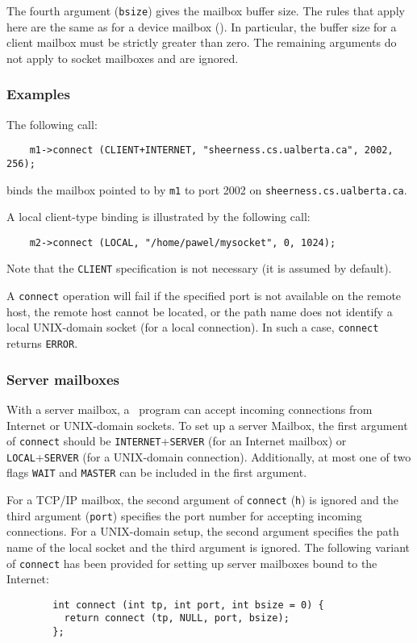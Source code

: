 The fourth argument ({\tt bsize}) gives the mailbox buffer size.
The rules that apply here are the same as for a device mailbox
().
In particular, the buffer size for a client mailbox must be strictly
greater than zero.
The remaining arguments do not apply to socket mailboxes and are ignored.

\subsubsection*{Examples}

\noindent
The following call:
\begin{verbatim}
    m1->connect (CLIENT+INTERNET, "sheerness.cs.ualberta.ca", 2002, 256);
\end{verbatim}
binds the mailbox pointed to by {\tt m1} to port 2002 on
{\tt sheerness.cs.ualberta.ca}.

A local client-type binding is illustrated by the following call:
\begin{verbatim}
    m2->connect (LOCAL, "/home/pawel/mysocket", 0, 1024);
\end{verbatim}
Note that the {\tt CLIENT} specification is not necessary (it is assumed by
default).

\medskip

\noindent
A {\tt connect} operation
will fail if the specified port is not available on the remote host,
the remote host cannot be located, or the path name does not identify a local
UNIX-domain socket (for a local connection).
In such a case, {\tt connect} returns {\tt ERROR}.

\subsubsection{Server mailboxes}
\label{rm_mb_bo_se}

With a server mailbox, a \smurph\ program can accept incoming connections
from Internet or UNIX-domain sockets.
To set up a server Mailbox, the first argument of {\tt connect} should be
{\tt INTERNET}+{\tt SERVER} (for an Internet mailbox) or
{\tt LOCAL}+{\tt SERVER} (for a UNIX-domain connection).
Additionally, at most one of two flags {\tt WAIT} and {\tt MASTER}
can be included in the first argument.

For a TCP/IP mailbox,
the second argument of {\tt connect} ({\tt h}) is ignored and the third
argument ({\tt port}) specifies the port number for accepting incoming
connections.
For a UNIX-domain setup, the second argument specifies the path name of
the local socket and the third argument is ignored.
The following variant of {\tt connect} has been provided for setting up
server mailboxes bound to the Internet:
\begin{verbatim}
        int connect (int tp, int port, int bsize = 0) {
          return connect (tp, NULL, port, bsize);
        };
\end{verbatim}

